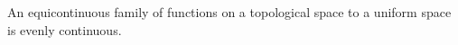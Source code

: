 An equicontinuous family of functions on a topological space to a uniform space is evenly continuous.
